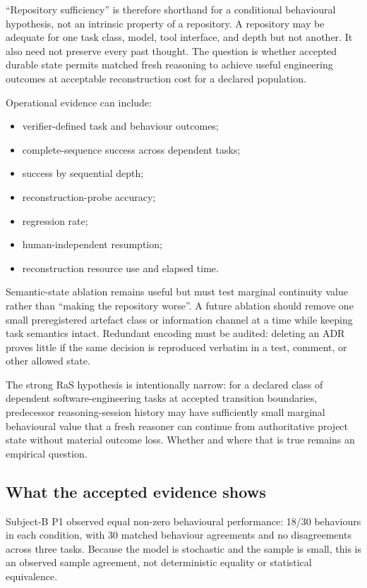 “Repository sufficiency” is therefore shorthand for a conditional behavioural hypothesis, not an intrinsic property of a repository. A repository may be adequate for one task class, model, tool interface, and depth but not another. It also need not preserve every past thought. The question is whether accepted durable state permits matched fresh reasoning to achieve useful engineering outcomes at acceptable reconstruction cost for a declared population.

Operational evidence can include:
\begin{itemize}
    \item verifier-defined task and behaviour outcomes;
    \item complete-sequence success across dependent tasks;
    \item success by sequential depth;
    \item reconstruction-probe accuracy;
    \item regression rate;
    \item human-independent resumption;
    \item reconstruction resource use and elapsed time.
\end{itemize}

Semantic-state ablation remains useful but must test marginal continuity value rather than “making the repository worse”. A future ablation should remove one small preregistered artefact class or information channel at a time while keeping task semantics intact. Redundant encoding must be audited: deleting an ADR proves little if the same decision is reproduced verbatim in a test, comment, or other allowed state.

The strong RaS hypothesis is intentionally narrow: for a declared class of dependent software-engineering tasks at accepted transition boundaries, predecessor reasoning-session history may have sufficiently small marginal behavioural value that a fresh reasoner can continue from authoritative project state without material outcome loss. Whether and where that is true remains an empirical question.

\subsection{What the accepted evidence shows}

Subject-B P1 observed equal non-zero behavioural performance: 18/30 behaviours in each condition, with 30 matched behaviour agreements and no disagreements across three tasks. Because the model is stochastic and the sample is small, this is an observed sample agreement, not deterministic equality or statistical equivalence.

